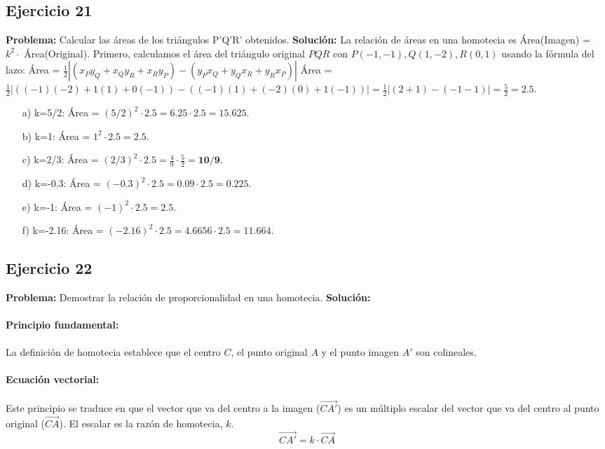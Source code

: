 \documentclass[12pt, letterpaper]{article}
\begin{document}
\subsection{Ejercicio 21}
\textbf{Problema:} Calcular las áreas de los triángulos P'Q'R' obtenidos.
\textbf{Solución:} La relación de áreas en una homotecia es Área(Imagen) = $k^2 \cdot$ Área(Original).
Primero, calculamos el área del triángulo original $PQR$ con $P(-1,-1), Q(1,-2), R(0,1)$ usando la fórmula del lazo:
Área = $\frac{1}{2} |(x_P y_Q + x_Q y_R + x_R y_P) - (y_P x_Q + y_Q x_R + y_R x_P)|$
Área = $\frac{1}{2} |((-1)(-2) + 1(1) + 0(-1)) - ((-1)(1) + (-2)(0) + 1(-1))| = \frac{1}{2} |(2+1) - (-1-1)| = \frac{5}{2} = 2.5$.
\begin{itemize}
    \item[a)] k=5/2: Área = $(5/2)^2 \cdot 2.5 = 6.25 \cdot 2.5 = \mathbf{15.625}$.
    \item[b)] k=1: Área = $1^2 \cdot 2.5 = \mathbf{2.5}$.
    \item[c)] k=2/3: Área = $(2/3)^2 \cdot 2.5 = \frac{4}{9} \cdot \frac{5}{2} = \mathbf{10/9}$.
    \item[d)] k=-0.3: Área = $(-0.3)^2 \cdot 2.5 = 0.09 \cdot 2.5 = \mathbf{0.225}$.
    \item[e)] k=-1: Área = $(-1)^2 \cdot 2.5 = \mathbf{2.5}$.
    \item[f)] k=-2.16: Área = $(-2.16)^2 \cdot 2.5 = 4.6656 \cdot 2.5 = \mathbf{11.664}$.
\end{itemize}

\subsection{Ejercicio 22}
\textbf{Problema:} Demostrar la relación de proporcionalidad en una homotecia.
\textbf{Solución:}
\paragraph{Principio fundamental:} La definición de homotecia establece que el centro $C$, el punto original $A$ y el punto imagen $A'$ son colineales. 
\paragraph{Ecuación vectorial:} Este principio se traduce en que el vector que va del centro a la imagen ($\vec{CA'}$) es un múltiplo escalar del vector que va del centro al punto original ($\vec{CA}$). El escalar es la razón de homotecia, $k$.
\[ \vec{CA'} = k \cdot \vec{CA} \]
\end{document}
